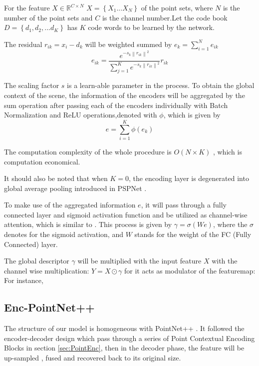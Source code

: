 \documentclass[runningheads]{llncs}
\begin{document}
For the feature $X \in \mathbb{R}^{ C \times N}$ $X=\left\{ X_{1} ... X_{N}\right\}$  of the point sets, where $N$ is the number of the point sets and $C$ is the channel number.Let 
the code book $D=\left\{d_{1},d_{2},...d_{K} \right\}$ has $K$ code words to be learned by the network.

The residual  $r_{ik}= x_{i}-d_{k}$ will be weighted summed by $e_{k}=\sum_{i=1}^{N} e_{ik}$
\begin{equation}
e_{ik} = \frac{e^{-s_{k}\left\| r_{ik}\right\|^{2}}}{\sum_{j=1}^{K} e^{-s_{k}\left\| r_{ik}\right\|^{2}} } r_{ik}
\label{encoding}
\end{equation}

The scaling factor $s$ is a learn-able parameter in the process.
To obtain the global context of the scene, the information of the encoders will be aggregated by the sum operation after passing each  of the encoders individually with Batch Normalization \cite{BN} and ReLU operations,denoted with $\phi$,  which is given by
\begin{equation}
    e=\sum_{i=1}^{K} \phi (e_{k})
 \label{aggregation}  
\end{equation}

The computation complexity of the whole procedure is $O(N \times K)$ , which is computation economical.

It should also be noted that when $K=0$, the encoding layer is degenerated into global average pooling introduced in PSPNet \cite{PSPNet}.

To make use of the aggregated information $e$, it  will pass through a fully connected layer and sigmoid activation function and be utilized as  channel-wise attention, which is similar to \cite{SENet}.  This process is given by $\gamma=\sigma(We)$, where the $\sigma$ denotes for the sigmoid activation, and $W$ stands for the weight of the FC (Fully Connected) layer.

The global descriptor $\gamma$ will be multiplied with the input feature $X$ with the channel wise multiplication: $Y=X\odot \gamma$ for it acts as modulator  of the featuremap: For instance, %
\label{sec:PointEnc}


\subsection{Enc-PointNet++}
The structure of our model is homogeneous with PointNet++ \cite{pointnet++}. It followed the encoder-decoder design which pass through a series of Point Contextual Encoding Blocks in section \ref{sec:PointEnc}, then in the decoder phase, the feature will be up-sampled , fused and  recovered back to its original size. 
\end{document}
